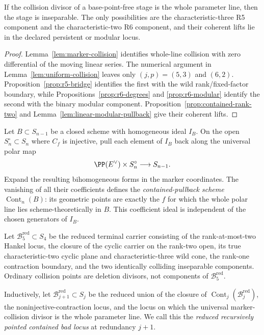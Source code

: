 \begin{lemma}
\label{supp:lem:identically-colliding}%
%
If the collision divisor of a base-point-free stage is the whole
parameter line, then the stage is inseparable.  The only possibilities
are the characteristic-three R5 component and the characteristic-two
R6 component, and their coherent lifts lie in the declared
persistent or modular locus.
\end{lemma}

\begin{proof}
Lemma~\ref{lem:marker-collision} identifies whole-line collision with
zero differential of the moving linear series.  The numerical argument
in Lemma~\ref{lem:uniform-collision} leaves only
\((j,p)=(5,3)\) and \((6,2)\).  Proposition~\ref{prop:r5-bridge}
identifies the first with the wild rank/fixed-factor boundary, while
Propositions~\ref{prop:r6-degrees} and
\ref{prop:r6-modular} identify the second with the binary modular
component.  Proposition~\ref{prop:contained-rank-two} and
Lemma~\ref{lem:linear-modular-pullback} give their coherent lifts.
\end{proof}

\begin{definition}
Let \(B\subset S_{n-1}\) be a closed scheme with homogeneous ideal
\(I_B\).  On the open \(S_n^\circ\subset S_n\) where \(C_f\) is
injective, pull each element of \(I_B\) back along the universal polar
map
\[
 \PP(E^\vee)\times S_n^\circ\longrightarrow S_{n-1}.
\]
Expand the resulting bihomogeneous forms in the marker coordinates.
The vanishing of all their coefficients defines the
\emph{contained-pullback scheme} \(\operatorname{Cont}_n(B)\):
its geometric points are exactly the \(f\) for which the whole polar
line lies scheme-theoretically in \(B\).  This coefficient ideal is
independent of the chosen generators of \(I_B\).

Let \(\mathcal B_5^{\mathrm{red}}\subset S_4\) be the reduced terminal
carrier consisting of the rank-at-most-two Hankel locus, the closure of
the cyclic carrier on the rank-two open, its true characteristic-two
cyclic plane and characteristic-three wild cone, the rank-one
contraction boundary, and the two identically colliding inseparable
components.  Ordinary collision points are deletion divisors, not
components of \(\mathcal B_5^{\mathrm{red}}\).

Inductively, let
\(\mathcal B_{j+1}^{\mathrm{red}}\subset S_j\) be the reduced union of
the closure of
\(\operatorname{Cont}_j(\mathcal B_j^{\mathrm{red}})\), the
noninjective-contraction locus, and the locus on which the universal
marker-collision divisor is the whole parameter line.  We call this
the \emph{reduced recursively pointed contained bad locus} at
redundancy \(j+1\).
\end{definition}

